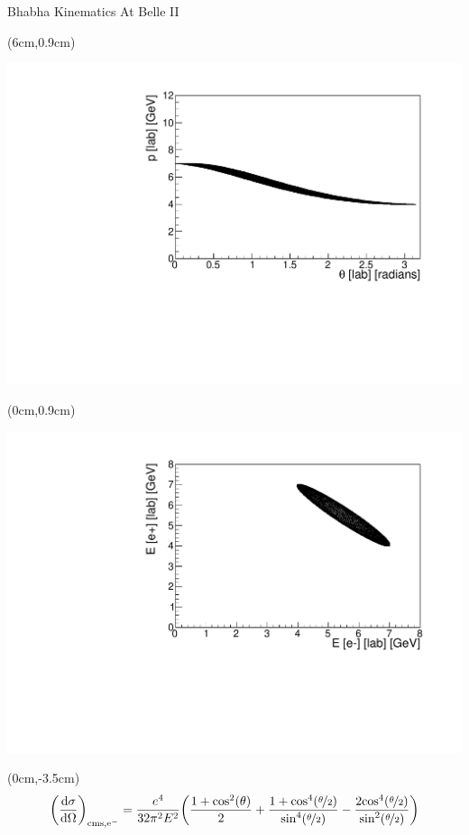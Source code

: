 \documentclass[8pt]{beamer}
\begin{document}
\begin{frame}{Bhabha Kinematics At Belle II}
	
	
	

	
	\begin{textblock*}{5.5cm}(6cm,0.9cm)
		
		\includegraphics[width=\textwidth]{VBilder/theta_lab}
	\end{textblock*}

	\begin{textblock*}{5.5cm}(0cm,0.9cm)
	
	\includegraphics[width=\textwidth]{VBilder/ee}
\end{textblock*}



\begin{textblock*}{11cm}(0cm,-3.5cm)
	\small{
			\begin{equation*}
	\bigg(\frac{\textrm{d}\sigma}{\textrm{d}\Omega} \bigg)_{\textrm{cms,e}^-} = \frac{e^4}{32\pi^2 E^2}
	\bigg(
	\frac{1+\textrm{cos}^2(\theta)}{2} +
	\frac{1+\textrm{cos}^4(\nicefrac{\theta}{2})}{\textrm{sin}^4(\nicefrac{\theta}{2})} - \frac{2\textrm{cos}^4(\nicefrac{\theta}{2})}{\textrm{sin}^2(\nicefrac{\theta}{2})}   \bigg)
	\label{eq:bhabhaCross}
	\end{equation*}
}
\end{textblock*}






\end{frame}
\end{document}

